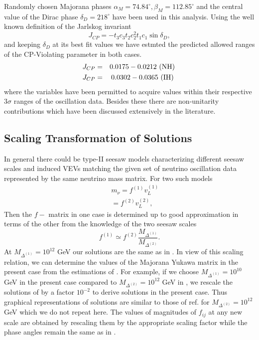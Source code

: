 \documentclass[a4paper,11pt]{article}
\newcommand{\be}{\begin{equation}}
\newcommand{\ee}{\end{equation}}
\newcommand{\bea}{\begin{eqnarray}}
\newcommand{\eea}{\end{eqnarray}}
\begin{document}
Randomly chosen Majorana phases \cite{scp:2018}
$\alpha_M=74.84^\circ,\beta_M=112.85^\circ$ and the central value of
the Dirac phase $\delta_D=218^\circ$ have been used in this analysis.
Using the well known definition of the Jarlskog invariant 
\be
J_{CP}=-t_{3}c_{3}t_{2}c_{2}^2t_{1}c_{1} \sin \delta_D, \label{eq:jcp}
\ee
and keeping $\delta_D$ at its best fit values
we have estmted the predicted allowed ranges of the CP-Violating parameter in both cases.
\bea
J_{CP}&=&0.0175-0.0212 \,\,(\rm NH)\, \nonumber\\
J_{CP}&=&0.0302-0.0365\,\,(\rm IH)\,\,\label{eq:numjcp}
\eea  
where the variables have been permitted to acquire values within their respective $3\sigma$ ranges of the oscillation data. Besides these there are non-unitarity contributions which have been discussed extensively in the literature.
\subsection{Scaling Transformation of Solutions}
In general there could be type-II seesaw models characterizing different seesaw scales and induced VEVs  matching the given set of neutrino oscillation data represented by the same neutrino mass matrix. For two such models
\bea
&&m_{\nu}=f^{(1)}v_L^{(1)} \nonumber\\
&&= f^{(2)}v_L^{(2)}, \label{eq:sc1}
\eea
Then the $f-$ matrix in one case is determined up to good approximation in terms of the other from the knowledge of the two seesaw scales\\
\be
f^{(1)} \simeq f^{(2)}\frac{M_{\Delta^{(1)}}}{M_{\Delta^{(2)}}}.\label{eq:sc2}
\ee
At $M_{\Delta^{(1)}}=10^{12}$ GeV our solutions are the same as in \cite{scp:2018}. 
In view of this scaling relation,  we can determine the values of the
Majorana Yukawa matrix in the present case from the estimations of
\cite{scp:2018}. For example, if we choose $M_{\Delta^{(1)}}=10^{10}$ GeV in the present case compared to
$M_{\Delta^{(2)}}=10^{12}$ GeV in \cite{scp:2018}, we rescale the solutions of
\cite{scp:2018} by a  factor $10^{-2}$ to derive solutions in the present case. 
Thus  graphical representations of solutions are similar to those of
ref.\cite{scp:2018} for $M_{\Delta^{(2)}}=10^{12}$ GeV which we do not
repeat here. The values of magnitudes of $f_{ij}$ at any new scale are
obtained by rescaling them by the appropriate scaling factor while the
phase angles remain the same as in \cite{scp:2018}.
\end{document}

